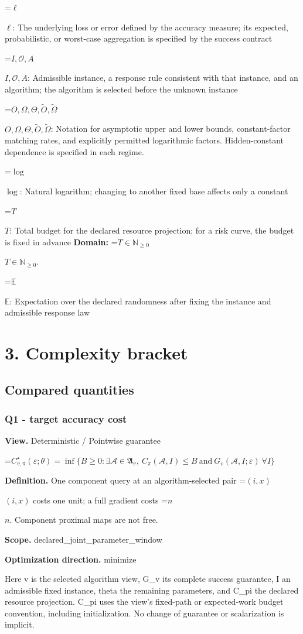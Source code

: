 \documentclass[10pt,a4paper]{article}
\newcommand{\AtlasMath}[1]{\par\begingroup\centering\setbox0=\hbox{$\displaystyle #1$}\ifdim\wd0>1.4\linewidth\typeout{ATLAS WIDE FORMULA: \the\wd0}\fi\ifdim\wd0>\linewidth\resizebox{\linewidth}{!}{\box0}\else\box0\fi\par\endgroup}
\newcommand{\AtlasInlineMath}[1]{\begingroup\setbox0=\hbox{$#1$}\ifdim\wd0>.4\linewidth\endgroup\AtlasMath{#1}\else\endgroup$#1$\fi}
\begin{document}
\AtlasInlineMath{\ell}: The underlying loss or error defined by the accuracy measure; its expected, probabilistic, or worst-case aggregation is specified by the success contract

\AtlasInlineMath{I,\mathcal{O},A}: Admissible instance, a response rule consistent with that instance, and an algorithm; the algorithm is selected before the unknown instance

\AtlasInlineMath{O,\Omega,\Theta,\widetilde{O},\widetilde\Omega}: Notation for asymptotic upper and lower bounds, constant-factor matching rates, and explicitly permitted logarithmic factors. Hidden-constant dependence is specified in each regime.

\AtlasInlineMath{\log}: Natural logarithm; changing to another fixed base affects only a constant

\AtlasInlineMath{T}: Total budget for the declared resource projection; for a risk curve, the budget is fixed in advance \textbf{Domain:} \AtlasInlineMath{T\in\mathbb{N}_{\ge0}}.

\AtlasInlineMath{\mathbb{E}}: Expectation over the declared randomness after fixing the instance and admissible response law

\section{3. Complexity bracket}
\subsection{Compared quantities}
\subsubsection{Q1 - target accuracy cost}
\textbf{View.} Deterministic / Pointwise guarantee

\AtlasMath{C^\star_{v,\pi}(\varepsilon;\theta)=\inf\{B\ge0:\exists\mathcal A\in\mathfrak A_v,\ C_\pi(\mathcal A,I)\le B\ \text{and}\ G_v(\mathcal A,I;\varepsilon)\ \forall I\}}
\textbf{Definition.} One component query at an algorithm-selected pair \AtlasInlineMath{(i,x)} costs one unit; a full gradient costs \AtlasInlineMath{n}. Component proximal maps are not free.

\textbf{Scope.} declared\_joint\_parameter\_window

\textbf{Optimization direction.} minimize

Here v is the selected algorithm view, G\_v its complete success guarantee, I an admissible fixed instance, theta the remaining parameters, and C\_pi the declared resource projection. C\_pi uses the view's fixed-path or expected-work budget convention, including initialization. No change of guarantee or scalarization is implicit.
\end{document}
